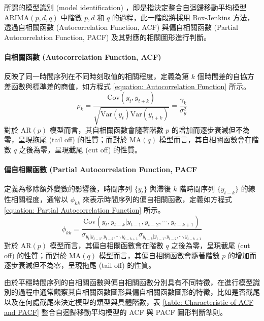 所謂的模型識別 (model identification) ，即是指決定整合自迴歸移動平均模型 $\text{ARIMA}(p, d, q)$ 中階數 $p, d$ 和 $q$ 的過程，此一階段將採用 Box-Jenkins 方法，透過自相關函數 (Autocorrelation Function, ACF) 與偏自相關函數 (Partial Autocorrelation Function, PACF) 及其對應的相關圖形進行判斷。

\paragraph{自相關函數 (Autocorrelation Function, ACF)}

反映了同一時間序列在不同時刻取值的相關程度，定義為第 $k$ 個時間差的自協方差函數與標準差的商值，如方程式 \eqref{equation: Autocorrelation Function} 所示。
%
\begin{equation}\label{equation: Autocorrelation Function}
  \rho_{k} = \frac{\mathrm{Cov}(y_t, y_{t + k})}{\sqrt{\mathrm{Var}(y_{t})\mathrm{Var}(y_{t+k})}} = \frac{\gamma_{k}}{\sigma_{y}^{2}}
\end{equation}
%
對於 $\text{AR}(p)$ 模型而言，其自相關函數會隨著階數 $p$ 的增加而逐步衰減但不為零，呈現拖尾 (tail off) 的性質；而對於 $\text{MA}(q)$ 模型而言，其自相關函數會在階數 $q$ 之後為零，呈現截尾 (cut off) 的性質。

\paragraph{偏自相關函數 (Partial Autocorrelation Function, PACF}

定義為移除額外變數的影響後，時間序列 $\{ y_t \}$ 與滯後 $k$ 階時間序列 $\{ y_{t-k} \}$ 的線性相關程度，通常以 $\phi_{kk}$ 來表示時間序列的偏自相關函數，定義如方程式 \eqref{equation: Partial Autocorrelation Function} 所示。
%
\begin{equation}\label{equation: Partial Autocorrelation Function}
  \phi_{kk} = \frac{\mathrm{Cov}(y_t, y_{t-k} | y_{t-1}, y_{t-2}, \cdots, y_{t-k+1})}{\sigma_{y_{t} | y_{t-1}, y_{t-2}, \cdots, y_{t-k+1}} \sigma_{y_{t-k} | y_{t-1}, y_{t-2}, \cdots, y_{t-k+1}}}
\end{equation}
%
對於 $\text{AR}(p)$ 模型而言，其偏自相關函數會在階數 $q$ 之後為零，呈現截尾 (cut off) 的性質；而對於 $\text{MA}(q)$ 模型而言，其偏自相關函數會隨著階數 $p$ 的增加而逐步衰減但不為零，呈現拖尾 (tail off) 的性質。

由於平穩時間序列的自相關函數與偏自相關函數分別具有不同特徵，在進行模型識別的過程中通常觀察其自相關函數圖形與偏自相關函數圖形的特徵，比如是否截尾以及在何處截尾來決定模型的類型與具體階數，表 \ref{table: Characteristic of ACF and PACF} 整合自迴歸移動平均模型的 ACF 與 PACF 圖形判斷準則。

